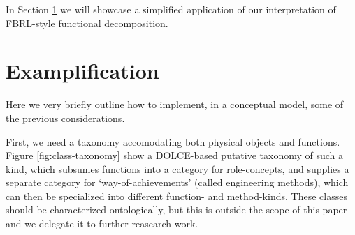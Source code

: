 \documentclass[
]{ceurart}
\begin{document}
In Section \ref{sec:use-case} we will showcase a simplified application of our interpretation of FBRL-style functional decomposition.


\section{Examplification}\label{sec:use-case}

Here we very briefly outline how to implement, in a conceptual model, some of the previous considerations.

First, we need a taxonomy accomodating both physical objects and functions. Figure \ref{fig:class-taxonomy} show a DOLCE-based \cite{borgoDOLCEDescriptiveOntology2022} putative taxonomy of such a kind, which subsumes functions into a category for role-concepts, and%
supplies a separate category for `way-of-achievements' (called engineering methods), which can then be specialized into different function- and method-kinds. These classes should be characterized ontologically, but this is outside the scope of this paper and we delegate it to further reasearch work. 
\end{document}
